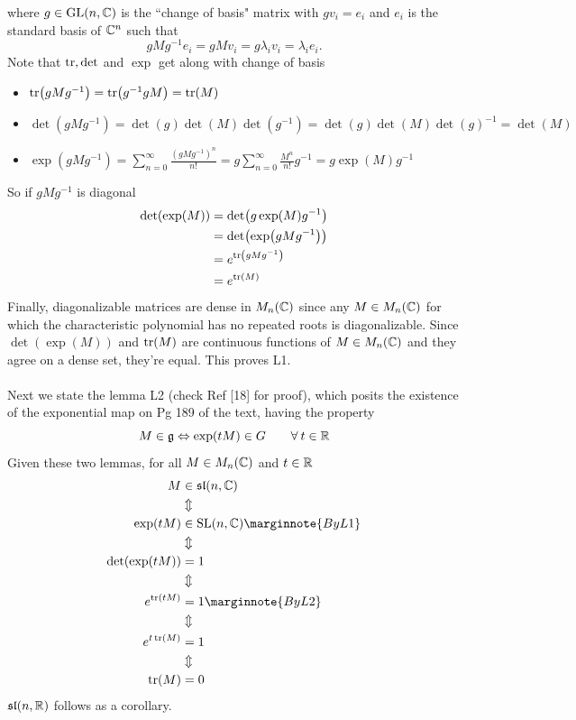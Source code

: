 \documentclass[10pt]{article}
\begin{document}
where $g \in \text{GL}(n,\mathbb{C})$ is the ``change of basis" matrix with $gv_i=e_i$ and $e_i$ is the standard basis of $\mathbb{C}^n$ such that
$$
gMg^{-1}e_i = gMv_i = g\lambda_iv_i = \lambda_ie_i.
$$
Note that $\tr,\det$ and $\exp$ get along with change of basis
\begin{itemize}
	\item $\tr(gMg^{-1}) = \tr(g^{-1}gM) = \tr(M)$
	\item $\det(gMg^{-1}) = \det(g)\det(M)\det(g^{-1}) = \det(g)\det(M)\det(g)^{-1} = \det(M)$
	\item $\exp(gMg^{-1}) = \sum_{n=0}^{\infty} \frac{(gMg^{-1})^n}{n!} = g\sum_{n=0}^{\infty} \frac{M^n}{n!}g^{-1} = g\exp(M)g^{-1}$
\end{itemize}
So if $gMg^{-1}$ is diagonal
$$
\begin{aligned}
	\det(\exp(M)) &= \det(g\exp(M)g^{-1})\\
	&= \det(\exp(gMg^{-1}))\\
	&= e^{\tr(gMg^{-1})}\\
	&= e^{\tr(M)}
\end{aligned}
$$
Finally, diagonalizable matrices are dense in $M_n(\mathbb{C})$ since any $M\in M_n(\mathbb{C})$ for which the characteristic polynomial has no repeated roots is diagonalizable. Since $\det(\exp(M))$ and $\tr(M)$ are continuous functions of $M\in M_n(\mathbb{C})$ and they agree on a dense set, they're equal. This proves L1.\\\\
Next we state the lemma L2 (check Ref [18] for proof), which posits the existence of the exponential map on Pg 189 of the text, having the property
$$
M \in \mathfrak{g} \Leftrightarrow \exp(tM) \in G \qquad \forall\: t\in \mathbb{R}
$$
Given these two lemmas, for all $M\in M_n(\mathbb{C})$ and $t\in \mathbb{R}$
$$
\begin{aligned}
	M &\in \mf{sl}(n,\C)\\
	&\Updownarrow\\
	\exp(tM) &\in \SL(n,\C)\marginnote{By L1}\\
	&\Updownarrow\\
	\det(\exp(tM)) &= 1\\
	&\Updownarrow\\
	e^{\tr(tM)} &= 1\marginnote{By L2}\\
	&\Updownarrow\\
	e^{t\tr(M)} &= 1\\
	&\Updownarrow\\
	\tr(M) &= 0
\end{aligned}
$$
$\mathfrak{sl}(n,\mathbb{R})$ follows as a corollary.
\end{document}
